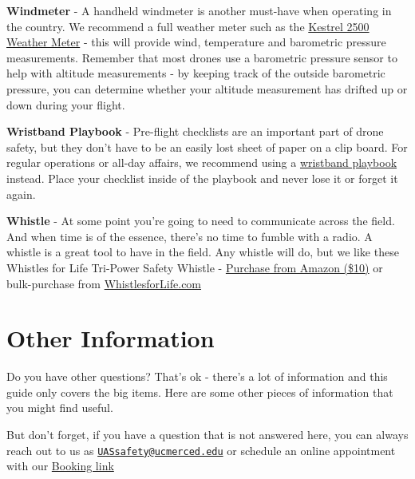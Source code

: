 \documentclass[
  12pt,
]{book}
\begin{document}
\textbf{Windmeter} - A handheld windmeter is another must-have when operating in the country. We recommend a full weather meter such as the \href{https://kestrelmeters.com/collections/all-kestrel-meters/products/kestrel-2500-weather-meter}{Kestrel 2500 Weather Meter} - this will provide wind, temperature and barometric pressure measurements. Remember that most drones use a barometric pressure sensor to help with altitude measurements - by keeping track of the outside barometric pressure, you can determine whether your altitude measurement has drifted up or down during your flight.

\textbf{Wristband Playbook} - Pre-flight checklists are an important part of drone safety, but they don't have to be an easily lost sheet of paper on a clip board. For regular operations or all-day affairs, we recommend using a \href{https://www.amazon.com/dp/B01DJJW8QW}{wristband playbook} instead. Place your checklist inside of the playbook and never lose it or forget it again.

\textbf{Whistle} - At some point you're going to need to communicate across the field. And when time is of the essence, there's no time to fumble with a radio. A whistle is a great tool to have in the field. Any whistle will do, but we like these Whistles for Life Tri-Power Safety Whistle - \href{https://www.amazon.com/Whistles-Life-Tri-Power-Whistle-Snorkelers/dp/B004RRZIUO/}{Purchase from Amazon (\$10)} or bulk-purchase from \href{https://whistlesforlife.com/}{WhistlesforLife.com}

\chapter{Other Information}\label{other-information}

Do you have other questions? That's ok - there's a lot of information and this guide only covers the big items. Here are some other pieces of information that you might find useful.

But don't forget, if you have a question that is not answered here, you can always reach out to us as \href{mailto:UASsafety@ucmerced.edu}{\nolinkurl{UASsafety@ucmerced.edu}} or schedule an online appointment with our \href{https://outlook.office365.com/owa/calendar/UCCenterofExcellenceonUASSafety@merced.onmicrosoft.com/bookings/}{Booking link}
\end{document}
